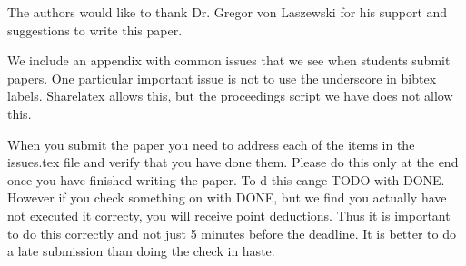 \documentclass[sigconf]{acmart}
\begin{document}
\begin{acks}

  The authors would like to thank Dr. Gregor von Laszewski for his support and suggestions to write this paper.

\end{acks}


 

\appendix

We include an appendix with common issues that we see when students
submit papers. One particular important issue is not to use the
underscore in bibtex labels. Sharelatex allows this, but the
proceedings script we have does not allow this.

When you submit the paper you need to address each of the items in the
issues.tex file and verify that you have done them. Please do this
only at the end once you have finished writing the paper. To d this
cange TODO with DONE. However if you check something on with DONE, but
we find you actually have not executed it correcty, you will receive
point deductions. Thus it is important to do this correctly and not
just 5 minutes before the deadline. It is better to do a late
submission than doing the check in haste. 


\end{document}
